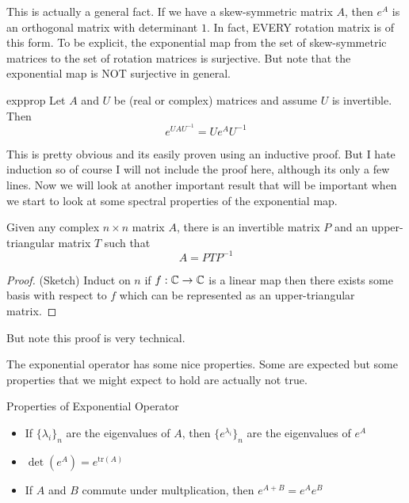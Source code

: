 This is actually a general fact. If we have a skew-symmetric matrix $A$, then $e^A$
is an orthogonal matrix with determinant $1$. In fact, EVERY
rotation matrix is of this form. To be explicit, the exponential map from the set
of skew-symmetric matrices to the set of rotation matrices is surjective. But note
that the exponential map is NOT surjective in general.

\begin{boxprop}{}{expprop}
    Let $A$ and $U$ be (real or complex) matrices and assume $U$ is invertible.
    Then
    \begin{equation*}
        e^{UAU^{-1}} = Ue^AU^{-1}
    \end{equation*}
\end{boxprop}

This is pretty obvious and its easily proven using an inductive proof. But I hate
induction so of course I will not include the proof here, although its only a few
lines. Now we will look at another important result that will be important when we
start to look at some spectral properties of the exponential map.

\begin{boxprop}{}{}
    Given any complex $n \times n$ matrix $A$, there is an invertible matrix $P$
    and an upper-triangular matrix $T$ such that
    \begin{equation*}
        A = PTP^{-1}
    \end{equation*}

    \begin{proof}
        (Sketch) Induct on $n$ if $f: \mathbb{C} \to \mathbb{C}$ is a linear map then there exists some basis
        with respect to $f$ which can be represented as an upper-triangular matrix.
    \end{proof}

    But note this proof is very technical.
\end{boxprop}

The exponential operator has some nice properties. Some are expected but some
properties that we might expect to hold are actually not true.

\begin{boxprop}{Properties of Exponential Operator}{}

    \begin{itemize}
        \item If $\{ \lambda_i \}_n$ are the eigenvalues of $A$, then $\{e^{\lambda_i}\}_n$
        are the eigenvalues of $e^A$
        \item $\det(e^A) = e^{ \text{tr} (A)}$
        \item If $A$ and $B$ commute under multplication, then $e^{A+B} = e^Ae^B$
    \end{itemize}
\end{boxprop}


